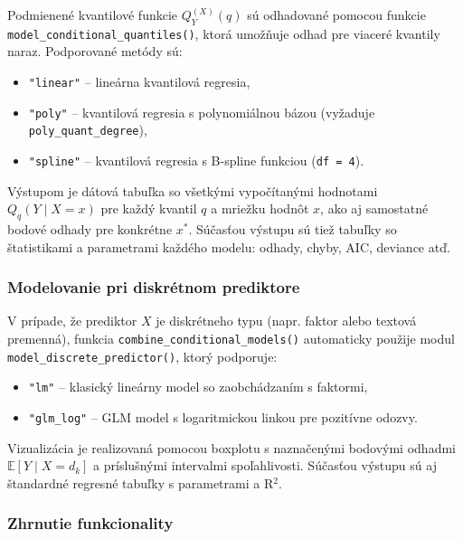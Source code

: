 Podmienené kvantilové funkcie $Q_Y^{(X)}(q)$ sú odhadované pomocou funkcie \texttt{model\_conditional\_quantiles()}, ktorá umožňuje odhad pre viaceré kvantily naraz. Podporované metódy sú:

\begin{itemize}
\setlength{\itemsep}{0pt}
  \setlength{\parskip}{0pt}
  \item \texttt{"linear"} – lineárna kvantilová regresia,
  \item \texttt{"poly"} – kvantilová regresia s polynomiálnou bázou (vyžaduje \texttt{poly\_quant\_degree}),
  \item \texttt{"spline"} – kvantilová regresia s B-spline funkciou (\texttt{df = 4}).
\end{itemize}

Výstupom je dátová tabuľka so všetkými vypočítanými hodnotami $Q_q(Y \mid X = x)$ pre každý kvantil $q$ a mriežku hodnôt $x$, ako aj samostatné bodové odhady pre konkrétne $x^*$. Súčasťou výstupu sú tiež tabuľky so štatistikami a parametrami každého modelu: odhady, chyby, AIC, deviance atď.

\subsubsection{Modelovanie pri diskrétnom prediktore}\label{subsec:app_discrete_pred}

V prípade, že prediktor $X$ je diskrétneho typu (napr. faktor alebo textová premenná), funkcia \texttt{combine\_conditional\_models()} automaticky použije modul \texttt{model\_discrete\_predictor()}, ktorý podporuje:

\begin{itemize}
\setlength{\itemsep}{0pt}
  \setlength{\parskip}{0pt}
  \item \texttt{"lm"} – klasický lineárny model so zaobchádzaním s faktormi,
  \item \texttt{"glm\_log"} – GLM model s logaritmickou linkou pre pozitívne odozvy.
\end{itemize}

Vizualizácia je realizovaná pomocou boxplotu s naznačenými bodovými odhadmi $\mathbb{E}[Y \mid X = d_k]$ a príslušnými intervalmi spoľahlivosti. Súčasťou výstupu sú aj štandardné regresné tabuľky s parametrami a R$^2$.

\subsubsection{Zhrnutie funkcionality}

